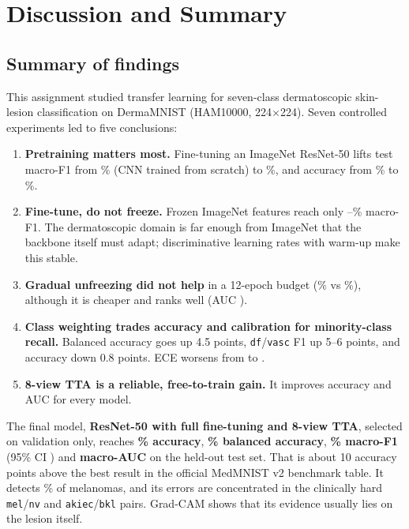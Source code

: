 \section{Discussion and Summary}
\label{sec:summary}

\subsection{Summary of findings}
This assignment studied transfer learning for seven-class dermatoscopic skin-lesion classification on DermaMNIST
(HAM10000, 224$\times$224). Seven controlled experiments led to five conclusions:
\begin{enumerate}
  \item \textbf{Pretraining matters most.} Fine-tuning an ImageNet ResNet-50 lifts test macro-F1 from
        \ScratchFOne\% (CNN trained from scratch) to \RFineFOne\%, and accuracy from \ScratchAcc\% to
        \RFineAcc\%.
  \item \textbf{Fine-tune, do not freeze.} Frozen ImageNet features reach only \RFrozenFOne--\EFrozenFOne\%
        macro-F1. The dermatoscopic domain is far enough from ImageNet that the backbone itself must adapt;
        discriminative learning rates with warm-up make this stable.
  \item \textbf{Gradual unfreezing did not help} in a 12-epoch budget (\RGradFOne\% vs \RFineFOne\%), although it
        is cheaper and ranks well (AUC \RGradAUC).
  \item \textbf{Class weighting trades accuracy and calibration for minority-class recall.} Balanced accuracy goes
        up 4.5 points, \texttt{df}/\texttt{vasc} F1 up 5--6 points, and accuracy down 0.8 points. ECE worsens from
        \RNoWECE{} to \RFineECE.
  \item \textbf{8-view TTA is a reliable, free-to-train gain.} It improves accuracy and AUC for every model.
\end{enumerate}

The final model, \textbf{ResNet-50 with full fine-tuning and 8-view TTA}, selected on validation only, reaches
\textbf{\RFineAccTTA\% accuracy}, \textbf{\RFineBalAccTTA\% balanced accuracy}, \textbf{\RFineFOneTTA\% macro-F1}
(95\% CI \RFineFOneTTACI) and \textbf{macro-AUC \RFineAUCTTA} on the held-out test set. That is about 10 accuracy
points above the best result in the official MedMNIST v2 benchmark table. It detects \BestRecMel\% of melanomas,
and its errors are concentrated in the clinically hard \texttt{mel}/\texttt{nv} and
\texttt{akiec}/\texttt{bkl} pairs. Grad-CAM shows that its evidence usually lies on the lesion itself.

